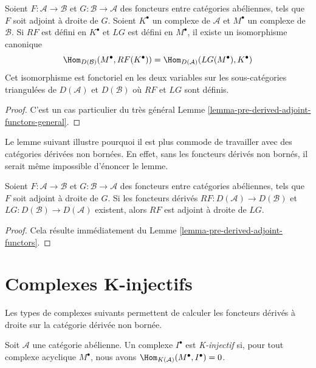 \begin{lemma}
\label{lemma-pre-derived-adjoint-functors}
Soient $F : \mathcal{A} \to \mathcal{B}$ et $G : \mathcal{B} \to \mathcal{A}$
des foncteurs entre catégories abéliennes, tels que $F$ soit adjoint à droite
de $G$. Soient $K^\bullet$ un complexe de $\mathcal{A}$ et $M^\bullet$ un
complexe de $\mathcal{B}$. Si $RF$ est défini en $K^\bullet$ et $LG$ est
défini en $M^\bullet$, il existe un isomorphisme canonique
$$
\Hom_{D(\mathcal{B})}(M^\bullet, RF(K^\bullet)) =
\Hom_{D(\mathcal{A})}(LG(M^\bullet), K^\bullet)
$$
Cet isomorphisme est fonctoriel en les deux variables sur les sous-catégories
triangulées de $D(\mathcal{A})$ et $D(\mathcal{B})$ où $RF$ et $LG$ sont
définis.
\end{lemma}

\begin{proof}
C'est un cas particulier du très général
Lemme \ref{lemma-pre-derived-adjoint-functors-general}.
\end{proof}

\noindent
Le lemme suivant illustre pourquoi il est plus commode de travailler avec des
catégories dérivées non bornées. En effet, sans les foncteurs dérivés non
bornés, il serait même impossible d'énoncer le lemme.

\begin{lemma}
\label{lemma-derived-adjoint-functors}
Soient $F : \mathcal{A} \to \mathcal{B}$ et $G : \mathcal{B} \to \mathcal{A}$
des foncteurs entre catégories abéliennes, tels que $F$ soit adjoint à droite
de $G$. Si les foncteurs dérivés
$RF : D(\mathcal{A}) \to D(\mathcal{B})$ et
$LG : D(\mathcal{B}) \to D(\mathcal{A})$ existent, alors $RF$ est adjoint à
droite de $LG$.
\end{lemma}

\begin{proof}
Cela résulte immédiatement du
Lemme \ref{lemma-pre-derived-adjoint-functors}.
\end{proof}

\section{Complexes K-injectifs}
\label{section-K-injective}

\noindent
Les types de complexes suivants permettent de calculer les foncteurs dérivés
à droite sur la catégorie dérivée non bornée.

\begin{definition}
\label{definition-K-injective}
Soit $\mathcal{A}$ une catégorie abélienne. Un complexe $I^\bullet$ est
{\it K-injectif} si, pour tout complexe acyclique $M^\bullet$, nous avons
$\Hom_{K(\mathcal{A})}(M^\bullet, I^\bullet) = 0$.
\end{definition}

